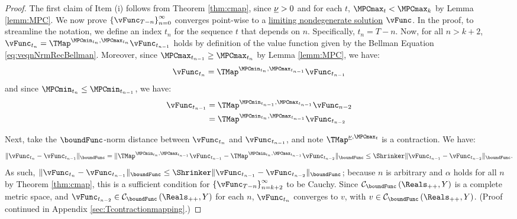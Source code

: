 \documentclass[BufferStockTheory]{subfiles}
\begin{document}
\begin{proof}

The first claim of Item (i) follows from Theorem \ref{thm:cmap}, since $\underline{\nu}>0$ and for each $t$, $\MPCmax_{t}< \MPCmax_{k}$ by Lemma \ref{lemm:MPC}.
We now prove $\left\{\vFunc_{T-n}\right\}_{n=0}^{\infty}$ converges point-wise to a \hyperlink{Definition-of-a-Nondegenerate-Solution}{limiting nondegenerate solution} $\vFunc$.
In the proof, to streamline the notation, we define an index $t_{n}$ for the sequence $t$ that depends on $n$.
Specifically, $t_{n} = T - n$.
Now, for all $n>k+2$, $\vFunc_{t_{n}} = \TMap^{\MPCmin_{t_{n}}, \MPCmax_{t_{n}}}\vFunc_{t_{n-1}}$ holds by definition of the value function given by the Bellman Equation \eqref{eq:veqnNrmRecBellman}.
Moreover, since $\MPCmax_{t_{n-1}}\geq \MPCmax_{t_{n}}$ by Lemma \ref{lemm:MPC}, we have:
%
\begin{equation*}
\vFunc_{t_{n}} = \TMap^{\MPCmin_{t_{n}}, \MPCmax_{t_{n-1}}}\vFunc_{t_{n-1}}
\end{equation*}
%
and since $\MPCmin_{t_{n}}\leq \MPCmin_{t_{n-1}}$, we have:
%
\begin{align*}
\vFunc_{t_{n-1}} &  = \TMap^{\MPCmin_{t_{n-1}}, \MPCmax_{t_{n-1}}}\vFunc_{n-2}\\ &  = \TMap^{\MPCmin_{t_{n}}, \MPCmax_{t_{n-1}}}\vFunc_{t_{n-2}} 
\end{align*}

Next, take the $\boundFunc$-norm distance between $\vFunc_{t_{n}}$ and $\vFunc_{t_{n-1}}$, and note  $\TMap^{\MPCminInf, \MPCmax_{t}}$ is a contraction.
We have:
%
\begin{equation*}
\Vert\vFunc_{t_{n}} - \vFunc_{t_{n-1}}\Vert_{\boundFunc} = \Vert\TMap^{\MPCmin_{t_{n}}, \MPCmax_{t_{n-1}}}\vFunc_{t_{n-1}} - \TMap^{\MPCmin_{t_{n}}, \MPCmax_{t_{n-1}}}\vFunc_{t_{n-2}}\Vert_{\boundFunc} \leq \Shrinker \Vert \vFunc_{t_{n-1}} - \vFunc_{t_{n-2}}\Vert_{\boundFunc}. 
\end{equation*}
%
As such, $\Vert \vFunc_{t_{n}} - \vFunc_{t_{n-1}}\Vert_{\boundFunc } \leq \Shrinker \Vert \vFunc_{t_{n-1}} - \vFunc_{t_{n-2}}\Vert_{\boundFunc } $; because $n$ is arbitrary and $\alpha$ holds for all $n$ by Theorem \ref{thm:cmap}, this is a sufficient condition for  $\left\{\vFunc_{T-n}\right\}_{n=k+2}^{\infty}$ to be Cauchy.
Since $\mathcal{C}_{\boundFunc }\left(\Reals_{++},Y\right) $ is a complete metric space, and $\vFunc_{t_{n-2}} \in \mathcal{C}_{\boundFunc }\left(\Reals_{++},Y\right)$ for each $n$, $\vFunc_{t_{n}}$ converges to $v$, with $v\in \mathcal{C}_{\boundFunc }\left(\Reals_{++},Y\right)$.
(Proof continued in Appendix \ref{sec:Tcontractionmapping}.)
\end{proof}
\end{document}
